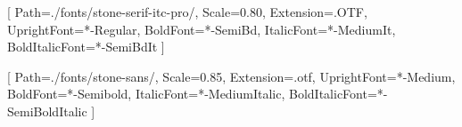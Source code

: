 \usepackage{microtype}
\usepackage{setspace}

\setlength{\parskip}{0em}
\setlength{\parindent}{1em}
\linespread{1.10}

\newcommand{\titleoriginal}{The Genesis Book}
\newcommand{\subtitleoriginal}{The Story of the People and Projects That Inspired Bitcoin}
\newcommand{\originalpublisher}{Bitcoin Magazine Books}
\newcommand{\yearoriginal}{2024}
\newcommand{\subtitletranslation}{Het verhaal van de mensen en projecten die Bitcoin inspireerden}
\newcommand{\yeartranslation}{2024}
\newcommand{\stringtranslation}{Vertaling}
\newcommand{\stringlicense}{Dit werk is gelicentieerd onder de CC BY-NC-ND 4.0-licentie. Om een kopie van deze licentie te bekijken, ga naar \url{https://creativecommons.org/licenses/by-nc-nd/4.0/}. }
\newcommand{\stringpublisher}{Uitgever}
\newcommand{\ISBNHC}{978-9916-749-40-1}
\newcommand{\ISBNSC}{978-9916-749-41-8}
\newcommand{\ISBNEBOOK}{978-9916-749-43-2}
\newcommand{\ISBNAUDIO}{978-9916-749-45-6}
\newcommand{\press}{Konsensus Network}
\newcommand{\translatorone}{Theo Hague}
\newcommand{\translators}{
\large\textit{\stringtranslation:}\\
\translatorone\\
}

\setstocksize{210mm}{148mm}
\settrimmedsize{210mm}{148mm}{*}
\setbinding{8mm}
\setlrmarginsandblock{12mm}{18mm}{*}
\setulmarginsandblock{20mm}{15mm}{*}

\usepackage{fontspec}
\setmainfont{stone-serif}[
    Path=./fonts/stone-serif-itc-pro/,
    Scale=0.80,
    Extension=.OTF,
    UprightFont=*-Regular,
    BoldFont=*-SemiBd,
    ItalicFont=*-MediumIt,
    BoldItalicFont=*-SemiBdIt
    ]

\setsansfont{stone-sans}[
    Path=./fonts/stone-sans/,
    Scale=0.85,
    Extension=.otf,
    UprightFont=*-Medium,
    BoldFont=*-Semibold,
    ItalicFont=*-MediumItalic,
    BoldItalicFont=*-SemiBoldItalic
    ]

\usepackage{lettrine}
\setcounter{DefaultLines}{3}
\renewcommand{\DefaultLoversize}{0.1}
\renewcommand{\DefaultLraise}{0}
\renewcommand{\LettrineTextFont}{}
\setlength{\DefaultFindent}{\fontdimen2\font}
\setlength{\DefaultNindent}{0em}

\makeatletter
\newcommand*\halftitlepage{\begingroup %
  \setlength\drop{0.1\textheight}
  \vspace*{\drop}
  \rule{\textwidth}{0in}\par
  {\Large\sffamily\thetitle\par}
  \rule{\textwidth}{0in}\par
  \vfill
\endgroup}
\makeatother

